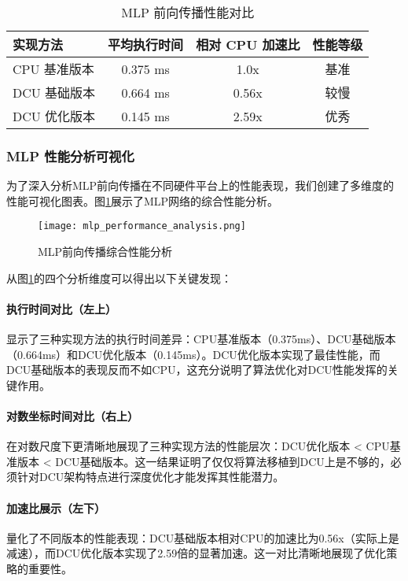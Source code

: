 \documentclass[a4paper]{article}
\begin{document}
\begin{table}[h]
\centering
\begin{tabular}{@{}lccc@{}}
\toprule
实现方法 & 平均执行时间 & 相对 CPU 加速比 & 性能等级 \\
\midrule
CPU 基准版本 & 0.375 ms & 1.0x & 基准 \\
DCU 基础版本 & 0.664 ms & 0.56x & 较慢 \\
DCU 优化版本 & 0.145 ms & 2.59x & 优秀 \\
\bottomrule
\end{tabular}
\caption{MLP 前向传播性能对比}
\end{table}

\subsubsection{MLP 性能分析可视化}

为了深入分析MLP前向传播在不同硬件平台上的性能表现，我们创建了多维度的性能可视化图表。图\ref{fig:mlp_comprehensive}展示了MLP网络的综合性能分析。

\begin{figure}[H]
\centering
\texttt{[image: mlp\_performance\_analysis.png]}
\caption{MLP前向传播综合性能分析}
\label{fig:mlp_comprehensive}
\end{figure}

从图\ref{fig:mlp_comprehensive}的四个分析维度可以得出以下关键发现：

\paragraph{执行时间对比（左上）}显示了三种实现方法的执行时间差异：CPU基准版本（0.375ms）、DCU基础版本（0.664ms）和DCU优化版本（0.145ms）。DCU优化版本实现了最佳性能，而DCU基础版本的表现反而不如CPU，这充分说明了算法优化对DCU性能发挥的关键作用。

\paragraph{对数坐标时间对比（右上）}在对数尺度下更清晰地展现了三种实现方法的性能层次：DCU优化版本 < CPU基准版本 < DCU基础版本。这一结果证明了仅仅将算法移植到DCU上是不够的，必须针对DCU架构特点进行深度优化才能发挥其性能潜力。

\paragraph{加速比展示（左下）}量化了不同版本的性能表现：DCU基础版本相对CPU的加速比为0.56x（实际上是减速），而DCU优化版本实现了2.59倍的显著加速。这一对比清晰地展现了优化策略的重要性。
\end{document}
